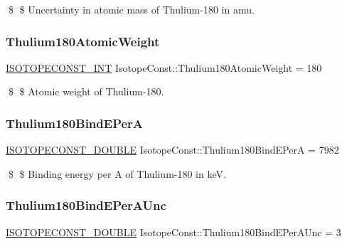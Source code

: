 \$ \$ Uncertainty in atomic mass of Thulium-\/180 in amu. \mbox{\label{group___isotope_const-_thulium-_tm180_ga961312c30461354162301f02e1398ad9}} 
\subsubsection{\texorpdfstring{Thulium180\+Atomic\+Weight}{Thulium180AtomicWeight}}
{\footnotesize\ttfamily \mbox{\hyperlink{group___isotope_const-_macros_ga5f18360b3e99483a35c32d789e62621c}{I\+S\+O\+T\+O\+P\+E\+C\+O\+N\+S\+T\+\_\+\+I\+NT}} Isotope\+Const\+::\+Thulium180\+Atomic\+Weight = 180}

\$ \$ Atomic weight of Thulium-\/180. \mbox{\label{group___isotope_const-_thulium-_tm180_ga921765a8ca396eb8d3ed998705e91293}} 
\subsubsection{\texorpdfstring{Thulium180\+Bind\+E\+PerA}{Thulium180BindEPerA}}
{\footnotesize\ttfamily \mbox{\hyperlink{group___isotope_const-_macros_ga8f45a7272ce02c0b4c65c44636ed719a}{I\+S\+O\+T\+O\+P\+E\+C\+O\+N\+S\+T\+\_\+\+D\+O\+U\+B\+LE}} Isotope\+Const\+::\+Thulium180\+Bind\+E\+PerA = 7982}

\$ \$ Binding energy per A of Thulium-\/180 in keV. \mbox{\label{group___isotope_const-_thulium-_tm180_ga5e597cf8cc6c4f43aa86dcdf2f5f230b}} 
\subsubsection{\texorpdfstring{Thulium180\+Bind\+E\+Per\+A\+Unc}{Thulium180BindEPerAUnc}}
{\footnotesize\ttfamily \mbox{\hyperlink{group___isotope_const-_macros_ga8f45a7272ce02c0b4c65c44636ed719a}{I\+S\+O\+T\+O\+P\+E\+C\+O\+N\+S\+T\+\_\+\+D\+O\+U\+B\+LE}} Isotope\+Const\+::\+Thulium180\+Bind\+E\+Per\+A\+Unc = 3}


